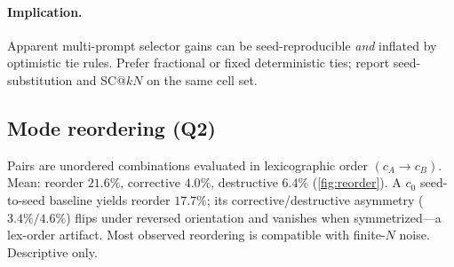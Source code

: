 \documentclass{article}
\newcommand{\pmode}{\pi_{\mathrm{mode}}}
\theoremstyle{plain}
\theoremstyle{definition}
\theoremstyle{remark}
\begin{document}
\begin{table}[t]
\centering
\caption{Seed-null plug-in oracle gap (pp): per-item
$\max_{\mathrm{seed}}-\mathrm{seed}\,0$ (not the $\pmode$ range).}
\label{tab:seed-null}
\scriptsize
{}
\end{table}

\paragraph{Implication.}
Apparent multi-prompt selector gains can be seed-reproducible \emph{and}
inflated by optimistic tie rules. Prefer fractional or fixed deterministic
ties; report seed-substitution and SC@$kN$ on the same cell set.

\subsection{Mode reordering (Q2)}
\label{sec:results-reorder}

Pairs are unordered combinations evaluated in lexicographic order
$(c_A{\to}c_B)$. Mean: reorder $21.6\%$, corrective $4.0\%$, destructive
$6.4\%$ (\cref{fig:reorder}). A $c_0$ seed-to-seed baseline yields reorder
$17.7\%$; its corrective/destructive asymmetry ($3.4\% / 4.6\%$) flips under
reversed orientation and vanishes when symmetrized---a lex-order artifact.
Most observed reordering is compatible with finite-$N$ noise. Descriptive only.
\end{document}
